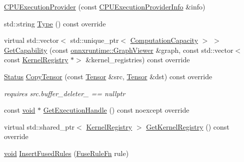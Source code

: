 \begin{DoxyCompactItemize}
\item 
\mbox{\hyperlink{classonnxruntime_1_1CPUExecutionProvider_a5f91ac5db5c44ab00e6685995bec416e}{C\+P\+U\+Execution\+Provider}} (const \mbox{\hyperlink{structonnxruntime_1_1CPUExecutionProviderInfo}{C\+P\+U\+Execution\+Provider\+Info}} \&info)
\item 
std\+::string \mbox{\hyperlink{classonnxruntime_1_1CPUExecutionProvider_a419ca314cd97d0561226e90755b29da2}{Type}} () const override
\item 
virtual std\+::vector$<$ std\+::unique\+\_\+ptr$<$ \mbox{\hyperlink{structonnxruntime_1_1ComputationCapacity}{Computation\+Capacity}} $>$ $>$ \mbox{\hyperlink{classonnxruntime_1_1CPUExecutionProvider_a5c6c0ee34c9768248d2bcb5f5b0aea70}{Get\+Capability}} (const \mbox{\hyperlink{classonnxruntime_1_1GraphViewer}{onnxruntime\+::\+Graph\+Viewer}} \&graph, const std\+::vector$<$ const \mbox{\hyperlink{classonnxruntime_1_1KernelRegistry}{Kernel\+Registry}} $\ast$$>$ \&kernel\+\_\+registries) const override
\item 
\mbox{\hyperlink{classonnxruntime_1_1common_1_1Status}{Status}} \mbox{\hyperlink{classonnxruntime_1_1CPUExecutionProvider_a6fc53592b62c7774860e59102df871f3}{Copy\+Tensor}} (const \mbox{\hyperlink{classonnxruntime_1_1Tensor}{Tensor}} \&src, \mbox{\hyperlink{classonnxruntime_1_1Tensor}{Tensor}} \&dst) const override
\begin{DoxyCompactList}\small\item\em requires src.\+buffer\+\_\+deleter\+\_\+ == nullptr \end{DoxyCompactList}\item 
const \mbox{\hyperlink{mlasi_8h_a88f941d423cb2a819b70a1358982b1a6}{void}} $\ast$ \mbox{\hyperlink{classonnxruntime_1_1CPUExecutionProvider_a43c0400ad3529ffc272f5db39682e0f8}{Get\+Execution\+Handle}} () const noexcept override
\item 
virtual std\+::shared\+\_\+ptr$<$ \mbox{\hyperlink{classonnxruntime_1_1KernelRegistry}{Kernel\+Registry}} $>$ \mbox{\hyperlink{classonnxruntime_1_1CPUExecutionProvider_a549e5e72c5c08a72a3e4a00b5e872f23}{Get\+Kernel\+Registry}} () const override
\item 
\mbox{\hyperlink{mlasi_8h_a88f941d423cb2a819b70a1358982b1a6}{void}} \mbox{\hyperlink{classonnxruntime_1_1CPUExecutionProvider_a38dfe044189eae1bc32675a064a487fa}{Insert\+Fused\+Rules}} (\mbox{\hyperlink{namespaceonnxruntime_a916d9c71f5b38a56c21340f816954b88}{Fuse\+Rule\+Fn}} rule)
\end{DoxyCompactItemize}
